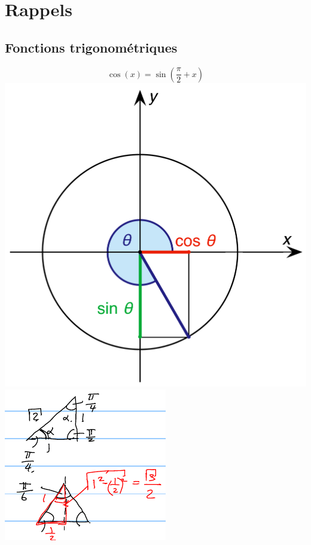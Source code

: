 \documentclass[12pt,a4paper]{article}
\begin{document}
\tableofcontents

\section{Rappels}
\subsection{Fonctions trigonométriques}
\begin{center}
\[\cos(x) = \sin(\frac{\pi}{2} + x)\]
\includegraphics[scale=0.2]{illustrations_Analyse/sin_and_cos}
\includegraphics[scale=0.7]{illustrations_Analyse/trigo}\\
\end{center}
\end{document}
